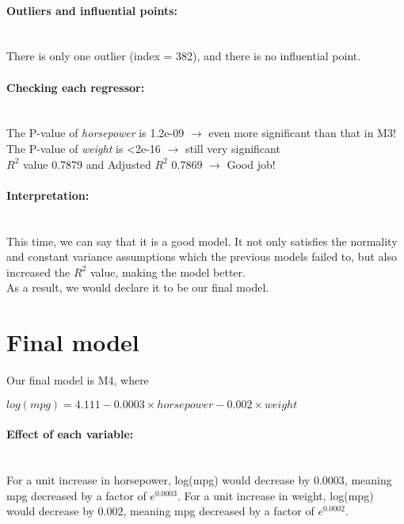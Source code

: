 \documentclass[12pt]{article}
\begin{document}
\paragraph{Outliers and influential points:}~{}
\\There is only one outlier (index = 382), and there is no influential point.\\


\paragraph{Checking each regressor:}~{}\\
The P-value of \textit{horsepower} is 1.2e-09 $\longrightarrow$ even more significant than that in M3!\\
The P-value of \textit{weight} is \textless 2e-16 $\longrightarrow$ still very significant\\
$R^2$ value 0.7879 and Adjusted $R^2$  0.7869 $\longrightarrow$ Good job!

\paragraph{Interpretation:}~{}\\
This time, we can say that it is a good model. It not only satisfies the normality and constant variance assumptions which the previous models failed to, but also increased the $R^2$ value, making the model better. \\
As a result, we would declare it to be our final model.

\section{Final model}
Our final model is M4, where\\
\begin{center}
$ log(mpg) = 4.111  -0.0003 \times horsepower  -0.002 \times weight $
\end{center}
\paragraph{Effect of each variable:}~{}\\
For a unit increase in horsepower, log(mpg) would decrease by 0.0003, meaning mpg decreased by a factor of $e^{0.0003}$. For a unit increase in weight, log(mpg) would decrease by 0.002, meaning mpg decreased by a factor of $e^{0.0002}$.
\end{document}
